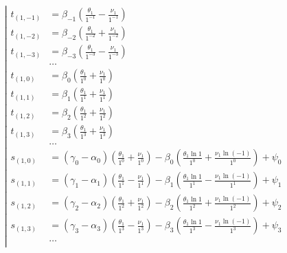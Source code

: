 \begin{equation*} \left| \begin{aligned}
t_{(1,-1)} &=
  \beta_{-1} 
  \left(
  \frac{\theta_1}{1^{-1}}
- \frac{\nu_1}{1^{-1}}
  \right) \\
%
t_{(1,-2)} &=
  \beta_{-2} 
  \left(
  \frac{\theta_1}{1^{-2}}
+ \frac{\nu_1}{1^{-2}}
  \right) \\
%
t_{(1,-3)} &=
  \beta_{-3} 
  \left(
  \frac{\theta_1}{1^{-3}}
- \frac{\nu_1}{1^{-3}}
  \right) \\
%
&\ldots \\
%
t_{(1,0)} &=
  \beta_0
  \left(
  \frac{\theta_1}{1^0}
+ \frac{\nu_1}{1^0}
  \right) \\
%
t_{(1,1)} &=
  \beta_1
  \left(
  \frac{\theta_1}{1^1}
+ \frac{\nu_1}{1^1}
  \right) \\
%
t_{(1,2)} &=
  \beta_2
  \left(
  \frac{\theta_1}{1^2}
+ \frac{\nu_1}{1^2}
  \right) \\
%
t_{(1,3)} &=
  \beta_3
  \left(
  \frac{\theta_1}{1^3}
+ \frac{\nu_1}{1^3}
  \right) \\
%
&\ldots \\
%
s_{(1,0)} &=
  (\gamma_0 - \alpha_0)
  \left(
  \frac{\theta_1}{1^0}
+ \frac{\nu_1}{1^0}
  \right)
- \beta_0 
  \left(
  \frac{\theta_1 \ln{1}}{1^0}
+ \frac{\nu_1 \ln{(- 1)}}{1^0}
  \right)
+ \psi_0 \\
%
s_{(1,1)} &=
  (\gamma_1 - \alpha_1)
  \left(
  \frac{\theta_1}{1^1}
- \frac{\nu_1}{1^1}
  \right)
- \beta_1 
  \left(
  \frac{\theta_1 \ln{1}}{1^1}
- \frac{\nu_1 \ln{(- 1)}}{1^1}
  \right)
+ \psi_1 \\
%
s_{(1,2)} &=
  (\gamma_2 - \alpha_2)
  \left(
  \frac{\theta_1}{1^2}
+ \frac{\nu_1}{1^2}
  \right)
- \beta_2
  \left(
  \frac{\theta_1 \ln{1}}{1^2}
+ \frac{\nu_1 \ln{(- 1)}}{1^2}
  \right)
+ \psi_2 \\
%
s_{(1,3)} &=
  (\gamma_3 - \alpha_3)
  \left(
  \frac{\theta_1}{1^3}
- \frac{\nu_1}{1^3}
  \right)
- \beta_3
  \left(
  \frac{\theta_1 \ln{1}}{1^3}
- \frac{\nu_1 \ln{(- 1)}}{1^3}
  \right)
+ \psi_3 \\
%
&\ldots \\
\end{aligned} \right. \end{equation*}

